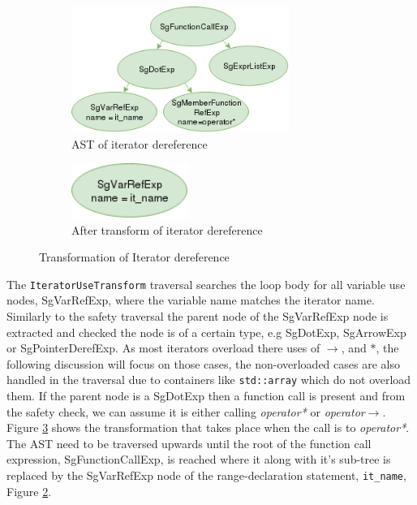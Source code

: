 \documentclass[bsc,frontabs,singlespacing,twoside,parskip,deptreport]{infthesis}
\begin{document}
\begin{figure}[H]
    \begin{subfigure}[b]{0.5\textwidth}
        \centering
            \includegraphics[height=4.1cm]{images/iterator-deref-replace-ast.png}
        \caption{AST of iterator dereference}
        \label{fig:iter-AST-Trans-deref-before}
    \end{subfigure}
    \hfill
    \begin{subfigure}[b]{0.5\textwidth}
        \centering
            \includegraphics[width=0.42\textwidth]{images/single-varRef-node.png}
        \caption{After transform of iterator dereference}
        \label{fig:iter-AST-Trans-deref-after}
    \end{subfigure}
    \vspace{-0.5cm}
    \caption{Transformation of Iterator dereference}
    \label{fig:iter-deref-use-trans}
\end{figure}

The \texttt{IteratorUseTransform} traversal searches the loop body for all variable use nodes, SgVarRefExp, where the variable name matches the iterator name. Similarly to the safety traversal the parent node of the SgVarRefExp node is extracted and checked the node is of a certain type, e.g SgDotExp, SgArrowExp or SgPointerDerefExp. As most iterators overload there uses of $\rightarrow$, and $*$, the following discussion will focus on those cases, the non-overloaded cases are also handled in the traversal due to containers like \texttt{std::array} which do not overload them. If the parent node is a SgDotExp then a function call is present and from the safety check, we can assume it is either calling \textit{operator*} or \textit{operator$\rightarrow$}. Figure \ref{fig:iter-deref-use-trans} shows the transformation that takes place when the call is to \textit{operator*}. The AST need to be traversed upwards until the root of the function call expression, SgFunctionCallExp, is reached where it along with it's sub-tree is replaced by the SgVarRefExp node of the range-declaration statement, \texttt{it\_name}, Figure \ref{fig:iter-AST-Trans-deref-after}. 
\end{document}
